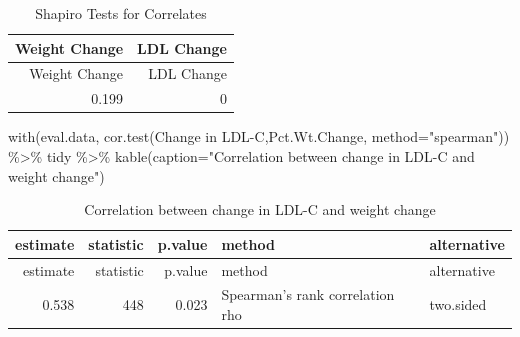 \documentclass[
]{article}
\newenvironment{Shaded}{\begin{snugshade}}{\end{snugshade}}
\newcommand{\AttributeTok}[1]{\textcolor[rgb]{0.77,0.63,0.00}{#1}}
\newcommand{\FunctionTok}[1]{\textcolor[rgb]{0.00,0.00,0.00}{#1}}
\newcommand{\NormalTok}[1]{#1}
\newcommand{\OtherTok}[1]{\textcolor[rgb]{0.56,0.35,0.01}{#1}}
\newcommand{\SpecialCharTok}[1]{\textcolor[rgb]{0.00,0.00,0.00}{#1}}
\newcommand{\StringTok}[1]{\textcolor[rgb]{0.31,0.60,0.02}{#1}}
\begin{document}
\begin{Shaded}
\end{Shaded}

\begin{longtable}[]{@{}rr@{}}
\caption{Shapiro Tests for Correlates}\tabularnewline
\toprule
Weight Change & LDL Change \\
\midrule
\endfirsthead
\toprule
Weight Change & LDL Change \\
\midrule
\endhead
0.199 & 0 \\
\bottomrule
\end{longtable}

\begin{Shaded}
\begin{Highlighting}[]
\FunctionTok{with}\NormalTok{(eval.data, }\FunctionTok{cor.test}\NormalTok{(}\StringTok{\textasciigrave{}}\AttributeTok{Change in LDL{-}C}\StringTok{\textasciigrave{}}\NormalTok{,Pct.Wt.Change, }\AttributeTok{method=}\StringTok{"spearman"}\NormalTok{)) }\SpecialCharTok{\%\textgreater{}\%}\NormalTok{ tidy }\SpecialCharTok{\%\textgreater{}\%} \FunctionTok{kable}\NormalTok{(}\AttributeTok{caption=}\StringTok{"Correlation between change in LDL{-}C and weight change"}\NormalTok{)}
\end{Highlighting}
\end{Shaded}

\begin{longtable}[]{@{}rrrll@{}}
\caption{Correlation between change in LDL-C and weight
change}\tabularnewline
\toprule
estimate & statistic & p.value & method & alternative \\
\midrule
\endfirsthead
\toprule
estimate & statistic & p.value & method & alternative \\
\midrule
\endhead
0.538 & 448 & 0.023 & Spearman's rank correlation rho & two.sided \\
\bottomrule
\end{longtable}
\end{document}
